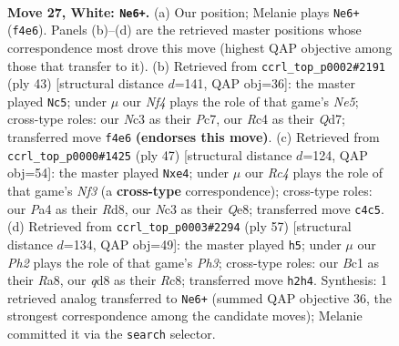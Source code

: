 \documentclass[11pt]{article}
\begin{document}
\begin{figure}[p]
\label{fig:thought-m50}
\end{figure}

\clearpage

\begin{figure}[p]\centering
\begin{subfigure}{0.46\textwidth}\centering
\resizebox{\linewidth}{!}{%
\newchessgame
\chessboard[
  setfen={r2qr3/ppp3k1/3b1pp1/3P1b1p/PnR2N2/2N3P1/RPP1QP1P/2B3K1 w - - 1 27},
  showmover=false,
  pgfstyle=straightmove, color=movearrow, markmove={f4-e6}
]}
\caption{}
\end{subfigure}\hfill
\begin{subfigure}{0.46\textwidth}\centering
\resizebox{\linewidth}{!}{%
\newchessgame
\chessboard[
  setfen={1r4k1/2pqrpb1/3p1np1/pN1P3p/2PBn3/P5PP/5PB1/R2Q1RK1 b - - 2 22},
  showmover=false,
  pgfstyle=straightmove, color=movearrow, markmove={e4-c5}
]}
\caption{}
\end{subfigure}
\\[4pt]
\begin{subfigure}{0.46\textwidth}\centering
\resizebox{\linewidth}{!}{%
\newchessgame
\chessboard[
  setfen={3rq3/p4pbk/1p1r1npp/P1pNpn2/4P2P/6P1/1PPB1PBK/1R1QR3 b - - 4 24},
  showmover=false,
  pgfstyle=straightmove, color=movearrow, markmove={f6-e4}
]}
\caption{}
\end{subfigure}\hfill
\begin{subfigure}{0.46\textwidth}\centering
\resizebox{\linewidth}{!}{%
\newchessgame
\chessboard[
  setfen={r1r5/p2nqpbk/1p4pp/P1nRp3/2P1P2P/4BN2/2BQ1PP1/R5K1 b - - 0 29},
  showmover=false,
  pgfstyle=straightmove, color=movearrow, markmove={h6-h5}
]}
\caption{}
\end{subfigure}
\caption{\textbf{Move 27, White: \texttt{Ne6+}.} (a) Our position; Melanie plays \texttt{Ne6+} (\texttt{f4e6}). Panels (b)--(d) are the retrieved master positions whose correspondence most drove this move (highest QAP objective among those that transfer to it). (b) Retrieved from \texttt{ccrl\_top\_p0002\#2191} (ply 43) [structural distance $d$=141, QAP obj=36]: the master played \texttt{Nc5}; under $\mu$ our \emph{Nf4} plays the role of that game's \emph{Ne5}; cross-type roles: our \emph{N}c3 as their \emph{P}c7, our \emph{R}c4 as their \emph{Q}d7; transferred move \texttt{f4e6} \textbf{(endorses this move)}. (c) Retrieved from \texttt{ccrl\_top\_p0000\#1425} (ply 47) [structural distance $d$=124, QAP obj=54]: the master played \texttt{Nxe4}; under $\mu$ our \emph{Rc4} plays the role of that game's \emph{Nf3} (a \textbf{cross-type} correspondence); cross-type roles: our \emph{P}a4 as their \emph{R}d8, our \emph{N}c3 as their \emph{Q}e8; transferred move \texttt{c4c5}. (d) Retrieved from \texttt{ccrl\_top\_p0003\#2294} (ply 57) [structural distance $d$=134, QAP obj=49]: the master played \texttt{h5}; under $\mu$ our \emph{Ph2} plays the role of that game's \emph{Ph3}; cross-type roles: our \emph{B}c1 as their \emph{R}a8, our \emph{q}d8 as their \emph{R}c8; transferred move \texttt{h2h4}. Synthesis: 1 retrieved analog transferred to \texttt{Ne6+} (summed QAP objective 36, the strongest correspondence among the candidate moves); Melanie committed it via the \texttt{search} selector.}
\label{fig:thought-m52}
\end{figure}
\end{document}
